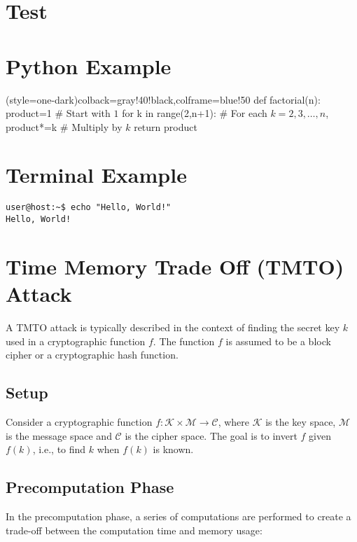 \section*{Test}

\section*{Python Example}
\begin{python}(style=one-dark){colback=gray!40!black,colframe=blue!50}
def factorial(n):
product=1                   # Start with $1$
for k in range(2,n+1):      # For each $k=2,3,\ldots,n$,
product*=k              # Multiply by $k$
return product
\end{python}

\section*{Terminal Example}
\begin{lstlisting}[style=terminalstyle, caption={Simulating a terminal command}]
user@host:~$ echo "Hello, World!"
Hello, World!
\end{lstlisting}
\newpage
\section{Time Memory Trade Off (TMTO) Attack}
A TMTO attack is typically described in the context of finding the secret key $k$ used in a cryptographic function $f$. The function $f$ is assumed to be a block cipher or a cryptographic hash function.

\subsection*{Setup}
Consider a cryptographic function $f: \mathcal{K}\times\mathcal{M} \rightarrow \mathcal{C}$, where $\mathcal{K}$ is the key space, $\mathcal{M}$ is the message space and $\mathcal{C}$ is the cipher space. The goal is to invert $f$ given $f(k)$, i.e., to find $k$ when $f(k)$ is known. 

\subsection*{Precomputation Phase}
In the precomputation phase, a series of computations are performed to create a trade-off between the computation time and memory usage:

